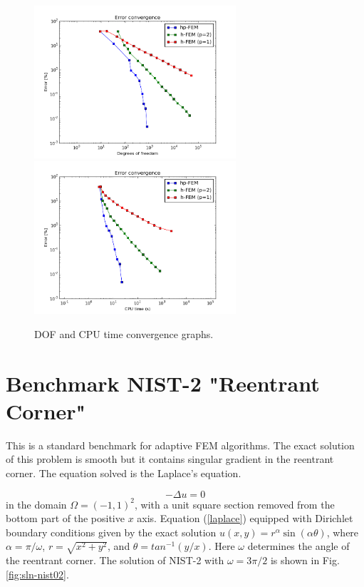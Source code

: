 \documentclass[12pt]{elsarticle}
\begin{document}
\begin{figure}[H]
\centering
\vspace{-3mm}
\hspace{-50mm}
\includegraphics[width=7.5cm]{nist/nist-1/conv_dof_aniso.png}\ \
\hspace{-8mm}
\includegraphics[width=7.5cm]{nist/nist-1/conv_cpu_aniso.png}
\hspace{-50mm}
\vspace{-2mm}
\caption{DOF and CPU time convergence graphs.}
\vspace{-5mm}
\label{fig:nist-1-conv}
\end{figure}


\section{Benchmark NIST-2 "Reentrant Corner"}
\label{sec:bench-2}

This is a standard benchmark for adaptive FEM algorithms.
The exact solution of this problem is smooth but it contains
singular gradient in the reentrant corner.
The equation solved is the Laplace's equation.

\begin{equation} \label{laplace}
-\Delta u = 0
\end{equation}
in the domain $\Omega = (-1, 1)^2$, with a unit square
section removed from the bottom part of the positive $x$ axis.
Equation (\ref{laplace}) equipped with Dirichlet
boundary conditions given by the exact solution
$u(x, y) = r^{\alpha}\sin(\alpha \theta)$,
where $\alpha = \pi / \omega$, $r = \sqrt{x^2+y^2}$,
and $\theta = tan^{-1}(y/x)$. Here $\omega $ determines
the angle of the reentrant corner.
The solution of NIST-2 with $\omega = 3 \pi / 2$
is shown in Fig. \ref{fig:sln-nist02}.
\end{document}
